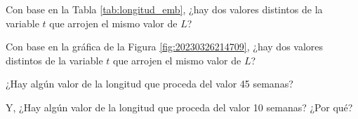 \begin{multicols}{2}
\begin{parts}
        Con base en la Tabla \ref{tab:longitud_emb}, ¿hay dos valores distintos de la variable $t$ que arrojen el mismo valor de $L$?

        \begin{solutionbox}{1.2cm}

        \end{solutionbox}

        Con base en la gráfica de la Figura \ref{fig:20230326214709}, ¿hay dos valores distintos de la variable $t$ que arrojen el mismo valor de $L$?

        \begin{solutionbox}{1.2cm}

        \end{solutionbox}

        ¿Hay algún valor de la longitud que proceda del valor 45 semanas?

        \begin{solutionbox}{1.2cm}

        \end{solutionbox}

        Y, ¿Hay algún valor de la longitud que proceda del valor 10 semanas? ¿Por qué?

        \begin{solutionbox}{1.2cm}

        \end{solutionbox}
    \end{parts}
\end{multicols}

